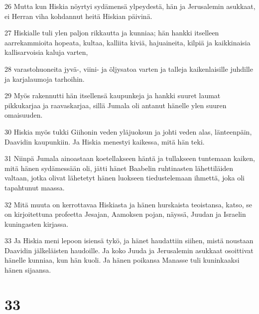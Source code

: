 \par 26 Mutta kun Hiskia nöyrtyi sydämensä ylpeydestä, hän ja Jerusalemin asukkaat, ei Herran viha kohdannut heitä Hiskian päivinä.
\par 27 Hiskialle tuli ylen paljon rikkautta ja kunniaa; hän hankki itselleen aarrekammioita hopeata, kultaa, kalliita kiviä, hajuaineita, kilpiä ja kaikkinaisia kallisarvoisia kaluja varten,
\par 28 varastohuoneita jyvä-, viini- ja öljysatoa varten ja talleja kaikenlaisille juhdille ja karjalaumoja tarhoihin.
\par 29 Myös rakennutti hän itsellensä kaupunkeja ja hankki suuret laumat pikkukarjaa ja raavaskarjaa, sillä Jumala oli antanut hänelle ylen suuren omaisuuden.
\par 30 Hiskia myös tukki Giihonin veden yläjuoksun ja johti veden alas, länteenpäin, Daavidin kaupunkiin. Ja Hiskia menestyi kaikessa, mitä hän teki.
\par 31 Niinpä Jumala ainoastaan koetellakseen häntä ja tullakseen tuntemaan kaiken, mitä hänen sydämessään oli, jätti hänet Baabelin ruhtinasten lähettiläiden valtaan, jotka olivat lähetetyt hänen luokseen tiedustelemaan ihmettä, joka oli tapahtunut maassa.
\par 32 Mitä muuta on kerrottavaa Hiskiasta ja hänen hurskaista teoistansa, katso, se on kirjoitettuna profeetta Jesajan, Aamoksen pojan, näyssä, Juudan ja Israelin kuningasten kirjassa.
\par 33 Ja Hiskia meni lepoon isiensä tykö, ja hänet haudattiin siihen, mistä noustaan Daavidin jälkeläisten haudoille. Ja koko Juuda ja Jerusalemin asukkaat osoittivat hänelle kunniaa, kun hän kuoli. Ja hänen poikansa Manasse tuli kuninkaaksi hänen sijaansa.

\chapter{33}

